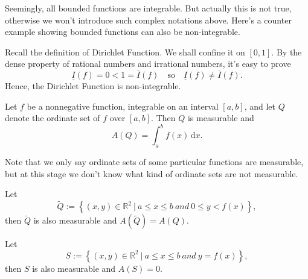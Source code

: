 \documentclass[a4paper]{ctexart}
\begin{document}
	\begin{myrmk}
		Seemingly, all bounded functions are integrable. But actually this is not true, otherwise we won't introduce such complex notations above. Here's a counter example showing bounded functions can also be non-integrable.
	\end{myrmk}
	\begin{myex}
		Recall the definition of Dirichlet Function. We shall confine it on $[0,1]$. By the dense property of rational numbers and irrational numbers, it's easy to prove
		\[
		\underline{I}(f) = 0 < 1 = \overline{I}(f) \quad \text{so} \quad \underline{I}(f) \neq \overline{I}(f).
		\]
		Hence, the Dirichlet Function is non-integrable.
	\end{myex}
	\begin{mythm}
	Let $f$ be a nonnegative function, integrable on an interval $[a,b]$, and let $Q$ denote the ordinate set of $f$ over $[a,b]$. Then $Q$ is measurable and
	\[
	A(Q)=\int_a^b f(x)\,\mathrm{d}x.
	\]
	\end{mythm}
	\begin{myrmk}
		Note that we only say ordinate sets of some particular functions are measurable, but at this stage we don't know what kind of ordinate sets are not measurable.
	\end{myrmk}
	\begin{mypro}
		Let
		\[
		\widetilde{Q}:=\left\{(x,y)\in \mathbb{R}^2\ |\ a\le x \le b\ and\ 0\le y< f(x)\right\},
		\]
		then $\widetilde{Q}$ is also measurable and $A\!\left(\widetilde{Q}\right)=A(Q)$.
	\end{mypro}
	\begin{mypro}
		Let 
		\[
		S:= \left\{(x,y)\in \mathbb{R}^2\ |\ a\le x \le b\ and\ y=f(x)\right\},
		\]
		then $S$ is also measurable and $A(S)=0$.
	\end{mypro}
	
\end{document}
